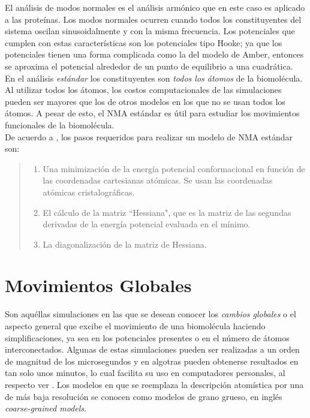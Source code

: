 El an\'{a}lisis de modos normales es el an\'{a}lisis arm\'{o}nico que en este caso es aplicado a las prote\'{i}nas. Los modos normales ocurren cuando todos los constituyentes del sistema oscilan sinusoidalmente y con la misma frecuencia. Los potenciales que cumplen con estas caracter\'{i}sticas son los potenciales tipo Hooke; ya que los potenciales tienen una forma complicada como la del modelo de Amber, entonces se aproxima el potencial alrededor de un punto de equilibrio a una cuadr\'{a}tica.\\

En el an\'{a}lisis \textit{est\'{a}ndar} los constituyentes son \textit{todos los \'{a}tomos} de la biomol\'{e}cula. Al utilizar todos los \'{a}tomos, los costos computacionales de las simulaciones pueden ser mayores que los de otros modelos en los que no se usan todos los \'{a}tomos. A pesar de esto, el NMA est\'{a}ndar es \'{u}til para estudiar los movimientos funcionales de la biomol\'{e}cula.\\

De acuerdo a \cite{Hayward2008}, los pasos requeridos para realizar un modelo de NMA est\'{a}ndar son:
\begin{quote}
 \begin{enumerate}
  \item Una minimizaci\'{o}n de la energ\'{i}a potencial conformacional en funci\'{o}n de las coordenadas cartesianas at\'{o}micas. Se usan las coordenadas at\'{o}micas cristalogr\'{a}ficas.
  \item El c\'{a}lculo de la matriz ``Hessiana", que es la matriz de las segundas derivadas de la energ\'{i}a potencial evaluada en el m\'{i}nimo. 
  \item La diagonalizaci\'{o}n de la matriz de Hessiana.
 \end{enumerate}
\end{quote}


\section{Movimientos Globales}

Son aqu\'{e}llas simulaciones en las que se desean conocer los \textit{cambios globales} o el aspecto general que excibe el movimiento de una biomol\'{e}cula haciendo simplificaciones, ya sea en los potenciales presentes o en el n\'{u}mero de \'{a}tomos interconectados. Algunas de estas simulaciones pueden ser realizadas a un orden de magnitud de los microsegundos y en algotras pueden obtenerse resultados en tan solo unos minutos, lo cual facilita su uso en computadores personales, al respecto ver \cite{Gur2013}. Los modelos en que se reemplaza la descripci\'{o}n atom\'{i}stica por una de m\'{a}s baja resoluci\'{o}n se conocen como modelos de grano grueso, en ingl\'{e}s \textit{coarse-grained models}.\\

